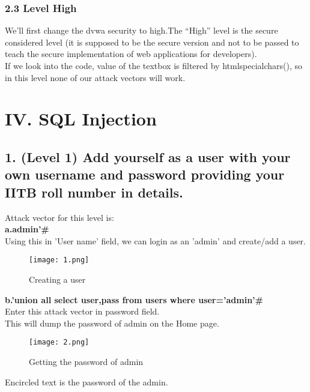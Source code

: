 \documentclass{article}
\begin{document}
\subsubsection*{2.3 Level High}
We'll first change the dvwa security to high.The “High” level is the secure considered level (it is supposed to be the secure version and not to be passed to teach the secure implementation of web applications for developers).\\
If we look into the code, value of the textbox is filtered by htmlspecialchars(), so in this level none of our attack vectors will work.


\section*{IV. SQL Injection}

\subsection*{1. (Level 1) Add yourself as a user with your own username and password providing your IITB roll number in details.}
  Attack vector for this level is:\\
        \textbf{a.\space \space admin'\#}\\
  Using this in 'User name' field, we can login as an 'admin' and create/add a user.\\
	\begin{figure}[htb]
	    \begin{center}
		\texttt{[image: 1.png]}
		\caption{Creating a user}
	    \end{center}
	\end{figure}
       
       \textbf{b.\space \space 'union all select user,pass from users where user='admin'\#}\\
               Enter this attack vector in password field.\\
               This will dump the password of admin on the Home page.\\
   
   \begin{figure}[htb]
	    \begin{center}
		\texttt{[image: 2.png]}
		\caption{Getting the password of admin}
	    \end{center}
	\end{figure}
        Encircled text is the password of the admin.\\
\end{document}

